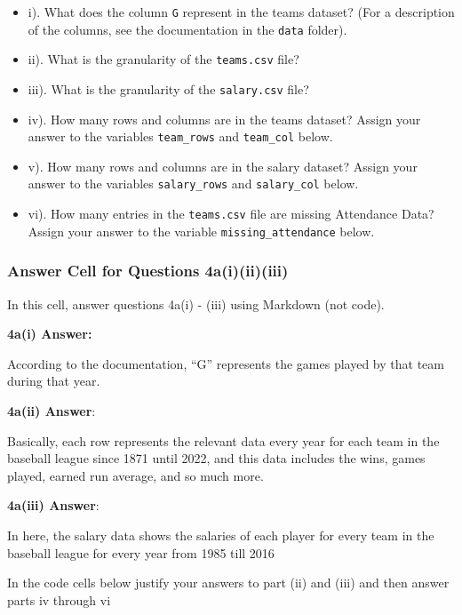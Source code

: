 \documentclass[11pt]{article}
\begin{document}
\begin{itemize}
\item
  i). What does the column \texttt{G} represent in the teams dataset?
  (For a description of the columns, see the documentation in the
  \texttt{data} folder).
\item
  ii). What is the granularity of the \texttt{teams.csv} file?
\item
  iii). What is the granularity of the \texttt{salary.csv} file?
\item
  iv). How many rows and columns are in the teams dataset? Assign your
  answer to the variables \texttt{team\_rows} and \texttt{team\_col}
  below.
\item
  v). How many rows and columns are in the salary dataset? Assign your
  answer to the variables \texttt{salary\_rows} and \texttt{salary\_col}
  below.
\item
  vi). How many entries in the \texttt{teams.csv} file are missing
  Attendance Data? Assign your answer to the variable
  \texttt{missing\_attendance} below.
\end{itemize}

    \subsubsection{Answer Cell for Questions
4a(i)(ii)(iii)}\label{answer-cell-for-questions-4aiiiiii}

In this cell, answer questions 4a(i) - (iii) using Markdown (not code).

\textbf{4a(i) Answer:}

According to the documentation, ``G'' represents the games played by
that team during that year.

\textbf{4a(ii) Answer}:

Basically, each row represents the relevant data every year for each
team in the baseball league since 1871 until 2022, and this data
includes the wins, games played, earned run average, and so much more.

\textbf{4a(iii) Answer}:

In here, the salary data shows the salaries of each player for every
team in the baseball league for every year from 1985 till 2016

In the code cells below justify your answers to part (ii) and (iii) and
then answer parts iv through vi
\end{document}

